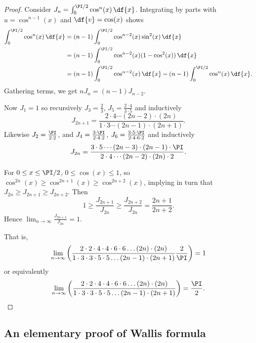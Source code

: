 \documentclass[12pt]{article}
\begin{document}
\begin{proof}
    Consider \( J_n = \int_0^{\PI/2} \cos^n(x) \, \df{x} \).
    Integrating by parts with \( u = \cos^{n-1}(x) \) and \( \df{v} =
    \cos(x) \) shows
    \begin{align*}
        \int_0^{\PI/2} \cos^n(x) \, \df{x} &= (n-1) \int_0^{\PI/2} \cos^
        {n-2}(x) \sin^2(x) \, \df{x} \\
        &= (n-1) \int_0^{\PI/2} \cos^{n-2}(x)(1 - \cos^2(x)) \, \df{x}
        \\
        &= (n-1) \int_0^{\PI/2} \cos^{n-2}(x) \, \df{x} - (n-1) \int_0^{\PI/2}
        \cos^n(x) \, \df{x}.
    \end{align*}
    Gathering terms, we get \( n J_n = (n-1) J_{n-2} \).

    Now \( J_1 = 1 \) so recursively \( J_3 = \frac{2}{3} \), \( J_5 =
    \frac{2 \cdot 4}{3 \cdot 5} \) and inductively
    \begin{equation}
        \label{eq:wallisformula:oddproduct} J_{2n+1} = \frac{2 \cdot 4
        \cdots (2n-2) \cdot (2n) }{1 \cdot 3 \cdots (2n-1) \cdot (2n+1)}.
    \end{equation}
    Likewise \( J_2 = \frac{\PI}{2\cdot2} \), and \( J_4 = \frac{3 \cdot
    \PI}{ 2 \cdot 4 \cdot 2} \), \( J_6 = \frac{3 \cdot 5 \cdot \PI}{2
    \cdot 4 \cdot 6 \cdot 2} \) and inductively
    \[
        J_{2n} = \frac{3 \cdot 5 \cdots (2n-3) \cdot (2n-1) \cdot \PI}{2
        \cdot 4 \cdots (2n-2) \cdot (2n) \cdot 2}.
    \]

    For \( 0 \le x \le \PI/2 \), \( 0 \le \cos(x) \le 1 \), so \( \cos^{2n}
    (x) \ge \cos^{2n+1}(x) \ge \cos^{2n+2}(x) \), implying in turn that \(
    J_{2n} \ge J_{2n+1} \ge J_{2n+2} \).  Then
    \[
        1 \ge \frac{J_{2n+1}}{J_{2n}} \ge \frac{J_{2n+2}}{J_{2n}} =
        \frac{2n+1}{2n+2}.
    \] Hence \( \lim_{n \to \infty} \frac{J_{2n+1}}{J_{2n}} = 1 \).

    That is,
    \[
        \lim_{n \to \infty} \left( \frac{ 2 \cdot 2 \cdot 4 \cdot 4
        \cdot 6 \cdot 6 \dots (2n) \cdot (2n)}{1 \cdot 3 \cdot 3 \cdot 5
        \cdot 5 \dots (2n-1)\cdot(2n+1)} \frac{2}{\PI} \right) = 1
    \] or equivalently
    \[
        \lim_{n \to \infty} \left( \frac{ 2 \cdot 2 \cdot 4 \cdot 4
        \cdot 6 \cdot 6 \dots (2n) \cdot (2n)}{1 \cdot 3 \cdot 3 \cdot 5
        \cdot 5 \dots (2n-1)\cdot(2n+1)} \right) = \frac{\PI}{2}.
    \]
\end{proof}

\subsection*{An elementary proof of Wallis formula}
\end{document}
